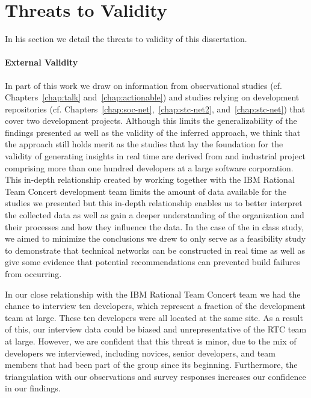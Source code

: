 \section{Threats to Validity}
\label{sec:threat}
In his section we detail the threats to validity of this dissertation.

\paragraph{External Validity}
In part of this work we draw on information from observational studies (cf. Chapters~\ref{chap:talk} and~\ref{chap:actionable}) and studies relying on development repositories (cf. Chapters~\ref{chap:soc-net},~\ref{chap:stc-net2}, and~\ref{chap:stc-net}) that cover two development projects.
Although this limits the generalizability of the findings presented as well as the validity of the inferred approach, we think that the approach still holds merit as the studies that lay the foundation for the validity of generating insights in real time are derived from and industrial project comprising more than one hundred developers at a large software corporation.
This in-depth relationship created by working together with the IBM Rational Team Concert development team limits the amount of data available for the studies we presented but this in-depth relationship enables us to better interpret the collected data as well as gain a deeper understanding of the organization and their processes and how they influence the data.
In the case of the in class study, we aimed to minimize the conclusions we drew to only serve as a feasibility study to demonstrate that technical networks can be constructed in real time as well as give some evidence that potential recommendations can prevented build failures from occurring.

In our close relationship with the IBM Rational Team Concert team we had the chance to interview ten developers, which represent a fraction of the development team at large. These ten developers were all located at the same site. As a result of this, our interview data could be biased and unrepresentative of the RTC team at large.
However, we are confident that this threat is minor, due to the mix of developers we interviewed, including novices, senior developers, and team members that had been part of the group since its beginning.
Furthermore, the triangulation with our observations and survey responses increases our confidence in our findings.

